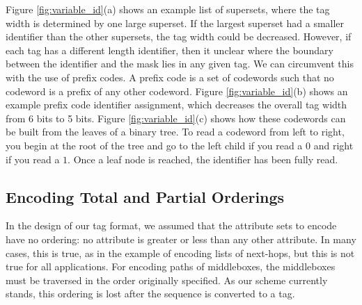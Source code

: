 Figure \ref{fig:variable_id}(a) shows an example list of supersets, where the tag width is determined by one large superset. If the largest superset had a smaller identifier than the other supersets, the tag width could be decreased. However, if each tag has a different length identifier, then it unclear where the boundary between the identifier and the mask lies in any given tag. We can circumvent this with the use of prefix codes. A prefix code is a set of codewords such that no codeword is a prefix of any other codeword. Figure \ref{fig:variable_id}(b) shows an example prefix code identifier assignment, which decreases the overall tag width from 6 bits to 5 bits. Figure \ref{fig:variable_id}(c) shows how these codewords can be built from the leaves of a binary tree. To read a codeword from left to right, you begin at the root of the tree and go to the left child if you read a $0$ and right if you read a $1$. Once a leaf node is reached, the identifier has been fully read.





\subsection{Encoding Total and Partial Orderings}
In the design of our tag format, we assumed that the attribute sets to encode have no ordering: no attribute is greater or less than any other attribute. In many cases, this is true, as in the example of encoding lists of next-hops, but this is not true for all applications. For encoding paths of middleboxes, the middleboxes must be traversed in the order originally specified. As our scheme currently stands, this ordering is lost after the sequence is converted to a tag. 

